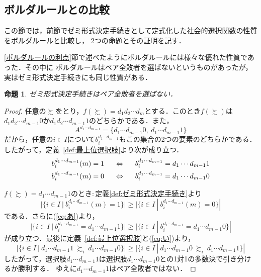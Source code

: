 \documentclass[dvipdfmx]{jsarticle}
\newtheorem{proposition}[definition]{命題}
\begin{document}
\subsection{ボルダルールとの比較}\label{subsec:ボルダルールとの比較}
この節では，前節でゼミ形式決定手続きとして定式化した社会的選択関数の性質をボルダルールと比較し，
2つの命題とその証明を記す．

\ref{ボルダルールの利点}節で述べたようにボルダルールには様々な優れた性質であった．その中に
ボルダルールはペア全敗者を選ばないというものがあったが，実はゼミ形式決定手続きにも同じ性質がある．
\begin{proposition}
  ゼミ形式決定手続きはペア全敗者を選ばない．
\end{proposition}
\begin{proof}
  任意の$\succsim$をとり，$f(\succsim) = d_1d_2\cdots d_m$とする．このとき$f(\succsim)$は
  $d_1d_2\cdots d_{m-1}0$か$d_1d_2\cdots d_{m-1}1$のどちらかである．また，
  \begin{equation}\label{eq:い}
    A^{d_1\cdots d_{m-1}} = \{d_1\cdots d_{m-1}0,\ d_1\cdots d_{m-1}1 \}
  \end{equation}
  だから，任意の$i \in I$について$b_i^{d_1\cdots d_{m-1}}$もこの集合の2つの要素のどちらかである．
  したがって，定義~\ref{def:最上位選択肢}より次が成り立つ．
  \begin{equation}\label{eq:あ}
    \begin{gathered}
      b_{i}^{d_1\cdots d_{m-1}}(m) = 1\hspace{5mm} \Leftrightarrow \hspace{5mm} b_{i}^{d_1\cdots d_{m-1}} = d_1\cdots d_{m-1}1 \\
      b_{i}^{d_1\cdots d_{m-1}}(m) = 0\hspace{5mm} \Leftrightarrow \hspace{5mm} b_{i}^{d_1\cdots d_{m-1}} = d_1\cdots d_{m-1}0
    \end{gathered}
  \end{equation}
  
  \noindent$f(\succsim) = d_1\cdots d_{m-1}1$のとき$\colon$定義\ref{def:ゼミ形式決定手続き}より
  \[
    |\{ i \in I \ | \ b_{i}^{d_1\cdots d_{m-1}}(m)=1 \}| \geq |\{ i \in I \ | \ b_{i}^{d_1\cdots d_{m-1}}(m)=0 \}|
  \]
  である．さらに(\ref{eq:あ})より，
  \[
    |\{ i \in I \ | \ b_{i}^{d_1\cdots d_{m-1}}=d_1\cdots d_{m-1}1 \}| \geq
    |\{ i \in I \ | \ b_{i}^{d_1\cdots d_{m-1}}=d_1\cdots d_{m-1}0 \}|
  \]
  が成り立つ．最後に定義~\ref{def:最上位選択肢}と(\ref{eq:い})より，
  \[
    |\{ i \in I \ | \ d_1\cdots d_{m-1}1\ \succsim_i\ d_1\cdots d_{m-1}0 \}| \geq
    |\{ i \in I \ | \ d_1\cdots d_{m-1}0\ \succsim_i\ d_1\cdots d_{m-1}1 \}|
  \]
  したがって，選択肢$d_1\cdots d_{m-1}1$は選択肢$d_1\cdots d_{m-1}0$との1対1の多数決で引き分けるか勝利する．
  ゆえに$d_1\cdots d_{m-1}1$はペア全敗者ではない．


\end{proof}
\end{document}
